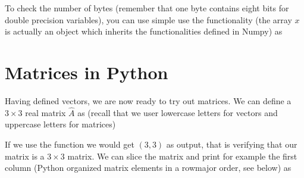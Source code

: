 \documentclass[letterpaper,10pt,english]{sphinxmanual}
\begin{document}
To check the number of bytes (remember that one byte contains eight bits for double precision variables), you can use simple use the  functionality (the array \(x\) is actually an object which inherits the functionalities defined in Numpy) as

\begin{sphinxVerbatim}[commandchars=\\\{\}]
   
  \PYG{p}{[}  \PYG{p}{]}
\end{sphinxVerbatim}


\section{Matrices in Python}
\label{\detokenize{chapter1:matrices-in-python}}
Having defined vectors, we are now ready to try out matrices. We can
define a \(3 \times 3 \) real matrix \(\hat{A}\) as (recall that we user
lowercase letters for vectors and uppercase letters for matrices)

\begin{sphinxVerbatim}[commandchars=\\\{\}]
   
  \PYG{p}{[} \PYG{p}{[}  \PYG{p}{]} \PYG{p}{[}  \PYG{p}{]} \PYG{p}{[}  \PYG{p}{]} \PYG{p}{]}
\end{sphinxVerbatim}

If we use the  function we would get \((3, 3)\) as output, that is verifying that our matrix is a \(3\times 3\) matrix. We can slice the matrix and print for example the first column (Python organized matrix elements in a row\sphinxhyphen{}major order, see below) as
\end{document}
